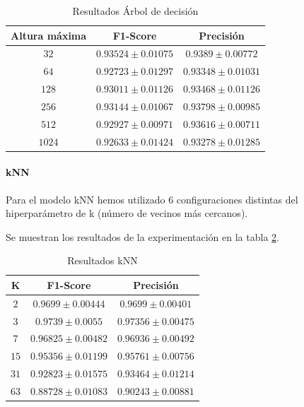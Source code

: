 \documentclass[12pt]{article}
\begin{document}
\begin{table}[!ht]
	\caption{Resultados Árbol de decisión}
	\centering
		 \begin{tabular}{||c c c||}
			\hline 
			Altura máxima & F1-Score & Precisión \\ [0.5ex]  
			\hline\hline
			$32$ & $0.93524 \pm 0.01075$ & $0.9389 \pm 0.00772$ \\
			\hline 
			$64$ & $0.92723 \pm 0.01297$ & $0.93348 \pm 0.01031$ \\
			\hline 
			$128$ & $0.93011 \pm 0.01126$ & $0.93468 \pm 0.01126$ \\
			\hline 
			$256$ & $0.93144 \pm 0.01067$ & $0.93798 \pm 0.00985$ \\
			\hline 
			$512$ & $0.92927 \pm 0.00971$ & $0.93616 \pm 0.00711$ \\
			\hline 
			$1024$ & $0.92633 \pm 0.01424$ & $0.93278 \pm 0.01285$ \\
			\hline
		 \end{tabular}
	\label{Tab:DecisionTree_5}
	\end{table}

\paragraph{kNN}
Para el modelo kNN hemos utilizado 6 configuraciones distintas del hiperparámetro de k (número de vecinos más cercanos).

Se muestran los resultados de la experimentación en la tabla \ref{Tab:kNN_5}.

\begin{table}[!ht]
	\caption{Resultados kNN}
	\centering
		\begin{tabular}{||c c c||}
			\hline 
			K & F1-Score & Precisión \\ [0.5ex]  
			\hline\hline
			$2$ & $0.9699 \pm 0.00444$ & $0.9699 \pm 0.00401$ \\
			\hline 
			$3$ & $0.9739 \pm 0.0055$ & $0.97356 \pm 0.00475$ \\
			\hline 
			$7$ & $0.96825 \pm 0.00482$ & $0.96936 \pm 0.00492$ \\
			\hline 
			$15$ & $0.95356 \pm 0.01199$ & $0.95761 \pm 0.00756$ \\
			\hline 
			$31$ & $0.92823 \pm 0.01575$ & $0.93464 \pm 0.01214$ \\
			\hline 
			$63$ & $0.88728 \pm 0.01083$ & $0.90243 \pm 0.00881$ \\
			\hline
		\end{tabular}
	\label{Tab:kNN_5}
\end{table}
\end{document}
